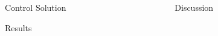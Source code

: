 \documentclass[final]{beamer}
\newlength{\sepwid}
\newlength{\onecolwid}
\newlength{\twocolwid}
\begin{document}
\begin{frame}[t]
\begin{columns}[t]
\begin{column}{\sepwid}\end{column} %

\begin{column}{\twocolwid} %


\begin{alertblock}{Control Solution\vspace{2pt}}

\end{alertblock}

\begin{alertblock}{Results\vspace{2pt}}
	
\end{alertblock} 

\end{column} %

\begin{column}{\sepwid}\end{column} %

\begin{column}{\onecolwid} %



\begin{alertblock}{Discussion\vspace{2pt}}
\centering
\vspace{.5cm}
\parbox{.95\textwidth}{

}\vspace{.5cm}
\end{alertblock}


\end{column}
\end{columns}
\end{frame}
\end{document}
